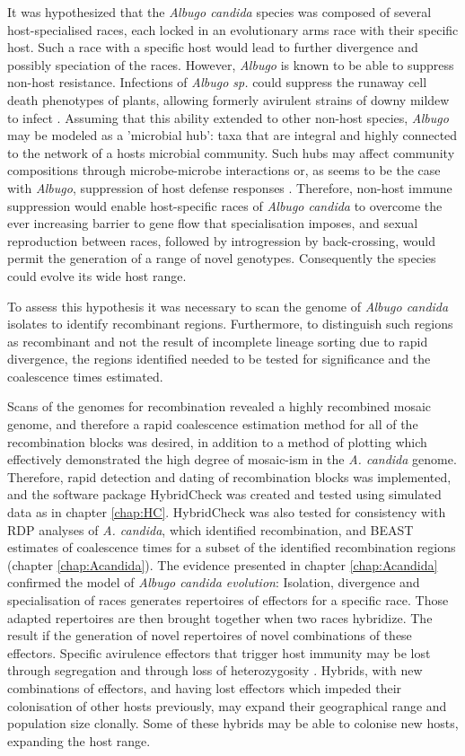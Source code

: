 It was hypothesized that the \textit{Albugo candida} species was composed of several host-specialised races, each locked in an evolutionary arms race with their specific host.
Such a race with a specific host would lead to further divergence and possibly speciation of the races.
However, \textit{Albugo} is known to be able to suppress non-host resistance.
Infections of \textit{Albugo sp.} could suppress the runaway cell death phenotypes of plants, allowing formerly avirulent strains of downy mildew to infect \parencite{Cooper2008}.
Assuming that this ability extended to other non-host species, \textit{Albugo} may be modeled as a 'microbial hub': taxa that are integral and highly connected to the network of a hosts microbial community.
Such hubs may affect community compositions through microbe-microbe interactions or, as seems to be the case with \textit{Albugo}, suppression of host defense responses \parencite{Agler2016}.
Therefore, non-host immune suppression would enable host-specific races of \textit{Albugo candida} to overcome the ever increasing barrier to gene flow that specialisation imposes, and sexual reproduction between races, followed by introgression by back-crossing, would permit the generation of a range of novel genotypes.
Consequently the species could evolve its wide host range.

To assess this hypothesis it was necessary to scan the genome of \textit{Albugo candida} isolates to identify recombinant regions.
Furthermore, to distinguish such regions as recombinant and not the result of incomplete lineage sorting due to rapid divergence, the regions identified needed to be tested for significance and the coalescence times estimated.

Scans of the genomes for recombination revealed a highly recombined mosaic genome, and therefore a rapid coalescence estimation method for all of the recombination blocks was desired, in addition to a method of plotting which effectively demonstrated the high degree of mosaic-ism in the \textit{A. candida} genome.
Therefore, rapid detection and dating of recombination blocks was implemented, and the software package HybridCheck was created  and tested using simulated data as in chapter \ref{chap:HC}.
HybridCheck was also tested for consistency with RDP analyses of \textit{A. candida}, which identified recombination, and BEAST estimates of coalescence times for a subset of the identified recombination regions (chapter \ref{chap:Acandida}).
The evidence presented in chapter \ref{chap:Acandida} confirmed the model of \textit{Albugo candida evolution}:
Isolation, divergence and specialisation of races generates repertoires of effectors for a specific race.
Those adapted repertoires are then brought together when two races hybridize.
The result if the generation of novel repertoires of novel combinations of these effectors.
Specific avirulence effectors that trigger host immunity may be lost through segregation and through loss of heterozygosity \parencite{Lamour2012PathogenCapsici,McMullan2015a}.
Hybrids, with new combinations of effectors, and having lost effectors which impeded their colonisation of other hosts previously, may expand their geographical range and population size clonally.
Some of these hybrids may be able to colonise new hosts, expanding the host range.

